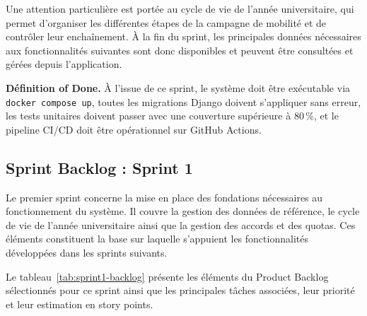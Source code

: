 Une attention particulière est portée au cycle de vie de l'année universitaire, qui permet d'organiser les différentes étapes de la campagne de mobilité et de contrôler leur enchaînement. À la fin du sprint, les principales données nécessaires aux fonctionnalités suivantes sont donc disponibles et peuvent être consultées et gérées depuis l'application.

\textbf{Définition of Done.} À l'issue de ce sprint, le système doit être exécutable via \texttt{docker compose up}, toutes les migrations Django doivent s'appliquer sans erreur, les tests unitaires doivent passer avec une couverture supérieure à 80\,\%, et le pipeline CI/CD doit être opérationnel sur GitHub Actions.

\setcounter{tasknum}{1}
\newcommand{\nexttask}{%
  \ifnum\value{tasknum}<10 0\fi\arabic{tasknum}%
  \stepcounter{tasknum}%
}

\newlength{\uswidth}
\setlength{\uswidth}{\dimexpr 15.0cm + 5\arrayrulewidth + 30pt\relax}

\newcommand{\usheadergreen}[2]{%
  \multicolumn{6}{|p{\uswidth}|}{%
    \cellcolor{green!8}%
    \textbf{#1} : \small\textit{#2}%
  } \\ \hline
}
\newcommand{\usheader}[2]{%
  \multicolumn{6}{|p{\uswidth}|}{%
    \cellcolor{blue!8}%
    \textbf{#1} : \small\textit{#2}%
  } \\ \hline
}

\subsection{Sprint Backlog : Sprint 1}

Le premier sprint concerne la mise en place des fondations nécessaires au fonctionnement du système. Il couvre la gestion des données de référence, le cycle de vie de l'année universitaire ainsi que la gestion des accords et des quotas. Ces éléments constituent la base sur laquelle s'appuient les fonctionnalités développées dans les sprints suivants.

Le tableau~\ref{tab:sprint1-backlog} présente les éléments du Product Backlog sélectionnés pour ce sprint ainsi que les principales tâches associées, leur priorité et leur estimation en story points.

\begingroup

\footnotesize

\setlength{\tabcolsep}{3pt}

\renewcommand{\arraystretch}{1.6}

